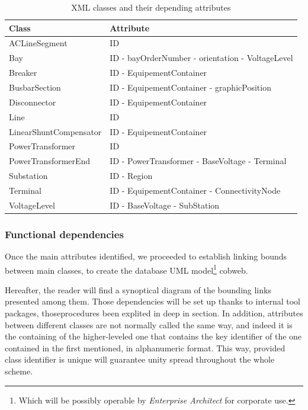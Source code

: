 \begin{table}[h]    \centering
\label{tab:classes_XML}
\caption{XML classes and their depending attributes}
\begin{tabular}{l|l}
\toprule
\textbf{Class} & \textbf{Attribute} \\ \midrule
ACLineSegment & ID \\
Bay & ID - bayOrderNumber - orientation - VoltageLevel \\
Breaker & ID - EquipementContainer \\
BusbarSection & ID - EquipementContainer - graphicPosition\\
Disconnector & ID - EquipementContainer \\
Line & ID \\
LinearShuntCompensator & ID - EquipementContainer \\
PowerTransformer & ID \\
PowerTransformerEnd & ID - PowerTransformer - BaseVoltage - Terminal \\
Substation & ID - Region \\
Terminal & ID - EquipementContainer - ConnectivityNode \\
VoltageLevel & ID - BaseVoltage - SubStation\\ 
\bottomrule
\end{tabular}
\end{table}

\subsubsection{Functional dependencies}
\label{sec:intro:AIG:structurisation:functional-dependencies}

Once the main attributes identified, we proceeded to establish linking bounds between main classes, to create the database UML model\footnote{Which will be possibly operable by \textit{Enterprise Architect} for corporate use.} cobweb.

Hereafter, the reader will find a synoptical diagram of the bounding links presented among them. Those dependencies will be set up thanks to internal tool packages, thoseprocedures been explited in deep in   section. In addition, attributes between different classes are not normally called the same way, and indeed it is the containing of the higher-leveled one that contains the key identifier of the one contained in the first mentioned, in alphanumeric format. This way, provided class identifier is unique will guarantee unity spread throughout the whole scheme.

